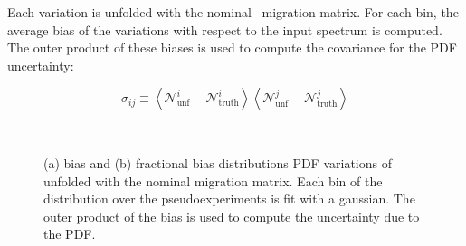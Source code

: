 Each variation is unfolded with the nominal \mcnlohw\ migration matrix. For each bin, the average bias of the variations with respect to the input spectrum is computed. The outer product of these biases is used to compute the covariance for the PDF uncertainty:

\begin{displaymath}
\sigma_{ij} \equiv \left \langle {\mathscr N}^{i}_{\textrm{unf}}-{\mathscr N}^{i}_{\textrm{truth}} \right \rangle \left \langle {\mathscr N}^{j}_{\textrm{unf}}-{\mathscr N}^{j}_{\textrm{truth}} \right \rangle
\end{displaymath}

\begin{figure}
~
~
\label{fig:pdfbias}
\caption{
(a) bias and (b) fractional bias distributions PDF variations of \mcnlohw unfolded with the nominal \mcnlohw migration matrix. Each bin of the distribution over the pseudoexperiments is fit with a gaussian. The outer product of the bias is used to compute the uncertainty due to the PDF.}
\end{figure}


